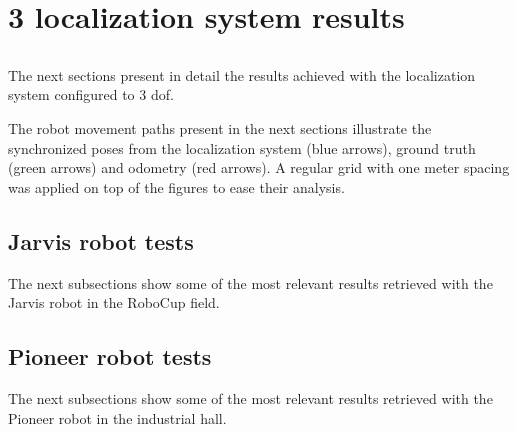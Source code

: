 \chapter{3  localization system results} \label{app:appendix-a}



\section*{}

The next sections present in detail the results achieved with the localization system configured to 3 \gls{dof}.

The robot movement paths present in the next sections illustrate the synchronized poses from the localization system (blue arrows), ground truth (green arrows) and odometry (red arrows). A regular grid with one meter spacing was applied on top of the figures to ease their analysis.



\clearpage
\section{Jarvis robot tests}

The next subsections show some of the most relevant results retrieved with the Jarvis robot in the RoboCup field.









\clearpage
\section{Pioneer robot tests}

The next subsections show some of the most relevant results retrieved with the Pioneer robot in the industrial hall.







